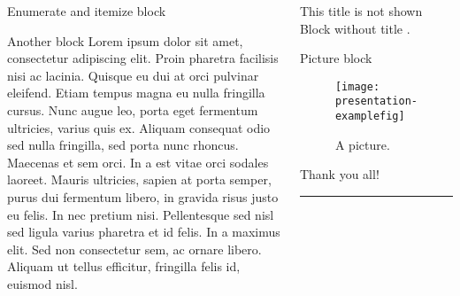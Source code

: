 \documentclass[english,xcolor=table,t]{beamer}
\begin{document}
\begin{frame}
\begin{columns}
\begin{vfillcolumn}{\colwidth}
\begin{block}{Enumerate and itemize block}
\end{block}

\vfill
\begin{block}{Another block}
Lorem ipsum dolor sit amet, consectetur adipiscing elit. Proin pharetra facilisis nisi ac lacinia. Quisque eu dui at orci pulvinar eleifend. Etiam tempus magna eu nulla fringilla cursus. Nunc augue leo, porta eget fermentum ultricies, varius quis ex. Aliquam consequat odio sed nulla fringilla, sed porta nunc rhoncus. Maecenas et sem orci. In a est vitae orci sodales laoreet. Mauris ultricies, sapien at porta semper, purus dui fermentum libero, in gravida risus justo eu felis. In nec pretium nisi. Pellentesque sed nisl sed ligula varius pharetra et id felis. In a maximus elit. Sed non consectetur sem, ac ornare libero. Aliquam ut tellus efficitur, fringilla felis id, euismod nisl.
\end{block}

\end{vfillcolumn}

\begin{vfillcolumn}{\colwidth}

\begin{exampleblock}{This title is not shown}
Block without title \citep{einstein1905elektrodynamik}.
\end{exampleblock} 
	
\begin{block}{Picture block}
\begin{figure}
	\centering
    \texttt{[image: presentation-examplefig]}
	\caption{A picture.}
\end{figure}

\end{block}

\vfill
\begin{exampleblock}{}
Thank you all! \\
\rule{\logoheight}{1pt}

\vskip -6pt


\end{exampleblock}

\end{vfillcolumn}
\end{columns}

\end{frame}
\end{document}
